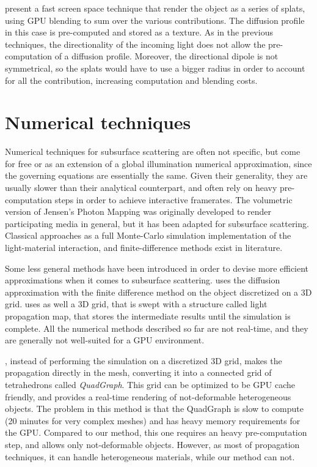 \cite{4736459} present a fast screen space technique that render the object as a series of splats, using GPU blending to sum over the various contributions. The diffusion profile in this case is pre-computed and stored as a texture. As in the previous techniques, the directionality of the incoming light does not allow the pre-computation of a diffusion profile. Moreover, the directional dipole is not symmetrical, so the splats would have to use a bigger radius in order to account for all the contribution, increasing computation and blending costs.

\section{Numerical techniques}

Numerical techniques for subsurface scattering are often not specific, but come for free or as an extension of a global illumination numerical approximation, since the governing equations are essentially the same. Given their generality, they are usually slower than their analytical counterpart, and often rely on heavy pre-computation steps in order to achieve interactive framerates. The volumetric version of Jensen's Photon Mapping\citep{Jensen:1998:ESL:280814.280925} was originally developed to render participating media in general, but it has been adapted for subsurface scattering\citep{Dorsey:1999:MRW:311535.311560}. Classical approaches as a full Monte-Carlo simulation implementation of the light-material interaction, and finite-difference methods exist in literature\citep{raey}. 

Some less general methods have been introduced in order to devise more efficient approximations when it comes to subsurface scattering. \cite{raey} uses the diffusion approximation with the finite difference method on the object discretized on a 3D grid. \cite{Fattal:2009:PMI:1477926.1477933} uses as well a 3D grid, that is swept with a structure called light propagation map, that stores the intermediate results until the simulation is complete. All the numerical methods described so far are not real-time, and they are generally not well-suited for a GPU environment. 

\cite{journals/cgf/WangWHSYG10}, instead of performing the simulation on a discretized 3D grid, makes the propagation directly in the mesh, converting it into a connected grid of tetrahedrons called \emph{QuadGraph}. This grid can be optimized to be GPU cache friendly, and provides a real-time rendering of not-deformable heterogeneous objects. The problem in this method is that the QuadGraph is slow to compute (20 minutes for very complex meshes) and has heavy memory requirements for the GPU. Compared to our method, this one requires an heavy pre-computation step, and allows only not-deformable objects. However, as most of propagation techniques, it can handle heterogeneous materials, while our method can not.

